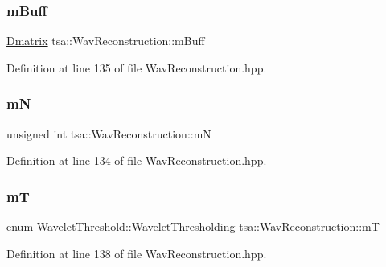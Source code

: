 \subsubsection{\texorpdfstring{m\+Buff}{mBuff}}
{\footnotesize\ttfamily \hyperlink{namespacetsa_ad260cd21c1891c4ed391fe788569aba4}{Dmatrix} tsa\+::\+Wav\+Reconstruction\+::m\+Buff\hspace{0.3cm}{\ttfamily [private]}}



Definition at line 135 of file Wav\+Reconstruction.\+hpp.

\mbox{\label{classtsa_1_1_wav_reconstruction_a27b9eb7cb4914273f4551579aba645a6}} 
\subsubsection{\texorpdfstring{mN}{mN}}
{\footnotesize\ttfamily unsigned int tsa\+::\+Wav\+Reconstruction\+::mN\hspace{0.3cm}{\ttfamily [private]}}



Definition at line 134 of file Wav\+Reconstruction.\+hpp.

\mbox{\label{classtsa_1_1_wav_reconstruction_a79826cf2c35973c054b45fa1e0e0a8f7}} 
\subsubsection{\texorpdfstring{mT}{mT}}
{\footnotesize\ttfamily enum \hyperlink{classtsa_1_1_wavelet_threshold_a50c42c95dae960986a985157ca038fae}{Wavelet\+Threshold\+::\+Wavelet\+Thresholding} tsa\+::\+Wav\+Reconstruction\+::mT\hspace{0.3cm}{\ttfamily [private]}}



Definition at line 138 of file Wav\+Reconstruction.\+hpp.

\mbox{\label{classtsa_1_1_wav_reconstruction_a487dbe8b4e390594631931f6bf7c60db}} 
